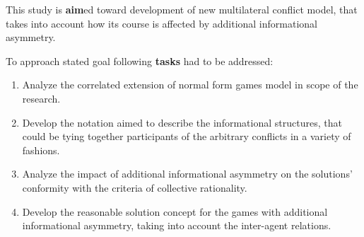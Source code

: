 
This study is \textbf{aim}ed toward development of new multilateral conflict model, that takes into account how its course is affected by additional informational asymmetry. %

To approach stated goal following \textbf{tasks} had to be addressed: %
\begin{enumerate}[beginpenalty=10000] %
  \item Analyze the correlated extension of normal form games model in scope of the research. %
  \item Develop the notation aimed to describe the informational structures, that could be tying together participants of the arbitrary conflicts in a variety of fashions. %
  \item Analyze the impact of additional informational asymmetry on the solutions' conformity with the criteria of collective rationality. %
  \item Develop the reasonable solution concept for the games with additional informational asymmetry, taking into account the inter-agent relations. %
\end{enumerate}


